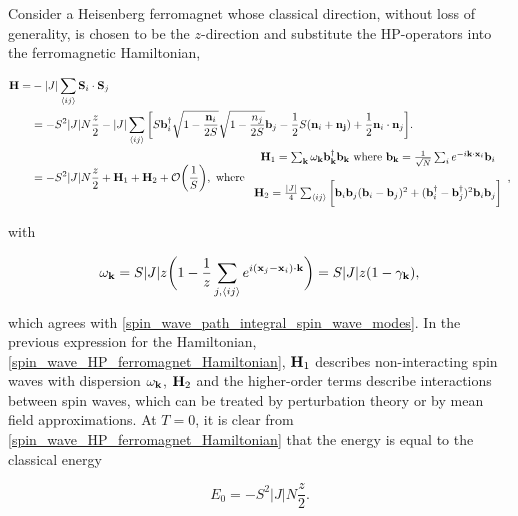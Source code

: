 Consider a Heisenberg ferromagnet whose classical direction, without loss of generality, is chosen to be the $z$-direction and substitute the HP-operators into the ferromagnetic Hamiltonian, 

\begin{equation}
    \begin{split}
        {\bf H} =& - |J| \sum_{\langle ij \rangle} {\bf S}_i \cdot {\bf S}_j \\
        &= - S^2 |J| N \frac{z}{2} - |J| \sum_{\langle ij \rangle} \bigg[ S {\bf b}_i^\dagger \sqrt{1 - \frac{{\bf n}_i}{2S}} \sqrt{1 - \frac{n_j}{2S}} {\bf b}_j - \frac{1}{2} S ({\bf n}_i + {\bf n_j}) + \frac{1}{2} {\bf n}_i \cdot {\bf n}_j \bigg]. \\
        &= - S^2 |J| N \frac{z}{2} + {\bf H}_1 + {\bf H}_2 + \mathcal{O}\bigg(\frac{1}{S}\bigg), \textnormal{ where } \begin{array}{cc}
             {\bf H}_1 = \sum_{{\bf k}} \omega_{{\bf k}} {\bf b}_{{\bf k}}^\dagger {\bf b}_{{\bf k}} \textnormal{ where ${\bf b}_{{\bf k}} = \frac{1}{\sqrt{N}} \sum_{i} e^{-i {\bf k} \cdot {\bf x}_i} {\bf b}_i$}  \\
             \\
             {\bf H}_2 = \frac{|J|}{4} \sum_{\langle ij  \rangle} \bigg[ {\bf b}_i {\bf b}_j ({\bf b}_i - {\bf b}_j)^2 + ({\bf b}_i^\dagger - {\bf b}_j^\dagger)^2 {\bf b}_i {\bf b}_j\bigg]
        \end{array},
    \end{split} 
    \label{spin_wave_HP_ferromagnet_Hamiltonian}
\end{equation}

with 

$$
    \omega_{{\bf k}} = S |J| z \bigg(1-\frac{1}{z} \sum_{j, \langle ij \rangle} e^{i({\bf x}_j - {\bf x}_i) \cdot {\bf k}}\bigg) = S |J| z (1 - \gamma_{{\bf k}}),
$$

which agrees with \cref{spin_wave_path_integral_spin_wave_modes}. In the previous expression for the Hamiltonian, \cref{spin_wave_HP_ferromagnet_Hamiltonian}, ${\bf H}_1$ describes non-interacting spin waves with dispersion $\omega_{{\bf k}}$, ${\bf H}_2$ and the higher-order terms describe interactions between spin waves, which can be treated by perturbation theory or by mean field approximations. At $T = 0$, it is clear from \cref{spin_wave_HP_ferromagnet_Hamiltonian} that the energy is equal to the classical energy 

$$
    E_0 = - S^2 |J| N \frac{z}{2}.
$$

